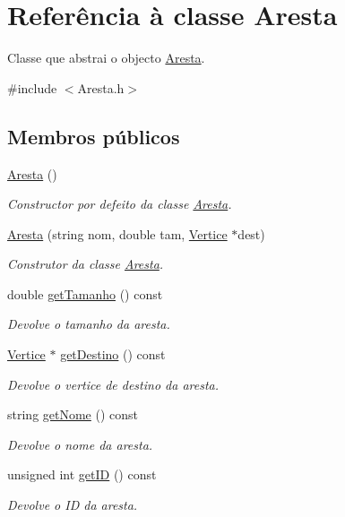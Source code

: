 \hypertarget{class_aresta}{\section{Referência à classe Aresta}
\label{class_aresta}
}


Classe que abstrai o objecto \hyperlink{class_aresta}{Aresta}.  




{\ttfamily \#include $<$Aresta.\-h$>$}

\subsection*{Membros públicos}
\begin{DoxyCompactItemize}
\item 
\hypertarget{class_aresta_a2324054916462e3a1b7a4ddde65513f0}{\hyperlink{class_aresta_a2324054916462e3a1b7a4ddde65513f0}{Aresta} ()}\label{class_aresta_a2324054916462e3a1b7a4ddde65513f0}

\begin{DoxyCompactList}\small\item\em Constructor por defeito da classe \hyperlink{class_aresta}{Aresta}. \end{DoxyCompactList}\item 
\hyperlink{class_aresta_a9c6a5906dc26229ac475f4df507256c2}{Aresta} (string nom, double tam, \hyperlink{class_vertice}{Vertice} $\ast$dest)
\begin{DoxyCompactList}\small\item\em Construtor da classe \hyperlink{class_aresta}{Aresta}. \end{DoxyCompactList}\item 
double \hyperlink{class_aresta_a85489edb5e22a759b0043e7264e0bccd}{get\-Tamanho} () const 
\begin{DoxyCompactList}\small\item\em Devolve o tamanho da aresta. \end{DoxyCompactList}\item 
\hyperlink{class_vertice}{Vertice} $\ast$ \hyperlink{class_aresta_a89ef99a56fff9ef20542c59d33f3a8b7}{get\-Destino} () const 
\begin{DoxyCompactList}\small\item\em Devolve o vertice de destino da aresta. \end{DoxyCompactList}\item 
string \hyperlink{class_aresta_af9e7806edf5bb7bd851ab94aa28a53bd}{get\-Nome} () const 
\begin{DoxyCompactList}\small\item\em Devolve o nome da aresta. \end{DoxyCompactList}\item 
unsigned int \hyperlink{class_aresta_a1a64f8b4e612fb7c851afe415462b6d0}{get\-I\-D} () const 
\begin{DoxyCompactList}\small\item\em Devolve o I\-D da aresta. \end{DoxyCompactList}\end{DoxyCompactItemize}
